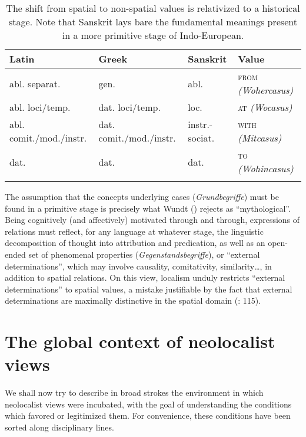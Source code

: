 \documentclass[output=paper]{langscibook}
\begin{document}
\begin{table}
\begin{tabularx}{\textwidth}{QQll}
\lsptoprule
Latin & Greek & Sanskrit  & Value\\\midrule
abl. separat. & gen. & abl. & \textsc{from} \textit{(Wohercasus)}\\ 
abl. loci\slash temp. & dat. loci\slash temp. & loc. & \textsc{at} \textit{(Wocasus)}\\
abl. comit.\slash mod.\slash instr. & dat. comit.\slash mod.\slash instr. & instr.-sociat. & \textsc{with} \textit{(Mitcasus)}\\
dat. & dat. & dat.  & \textsc{to} \textit{(Wohincasus)}\\
\lspbottomrule
\end{tabularx}
\caption{The shift from spatial to non-spatial values is relativized to a historical stage. Note that Sanskrit lays bare the fundamental meanings present in a more primitive stage of Indo-European.}
\end{table}

The assumption that the concepts underlying cases (\textit{Grundbegriffe}) must be found in a primitive stage is precisely what Wundt (\citealt{wundt_volkerpsychologie._1912}) rejects as “mythological”. Being cognitively (and affectively) motivated through and through, expressions of relations must reflect, for any language at whatever stage, the linguistic decomposition of thought into attribution and predication, as well as an open-ended set of phenomenal properties (\textit{Gegenstandsbegriffe}), or “external determinations”, which may involve causality, comitativity, similarity…, in addition to spatial relations. On this view, localism unduly restricts “external determinations” to spatial values, a mistake justifiable by the fact that external determinations are maximally distinctive in the spatial domain (\citealt{wundt_volkerpsychologie._1912}: 115).

\section{The global context of neolocalist views}
We shall now try to describe in broad strokes the environment in which neolocalist views were incubated, with the goal of understanding the conditions which favored or legitimized them. For convenience, these conditions have been sorted along disciplinary lines. 
\end{document}
